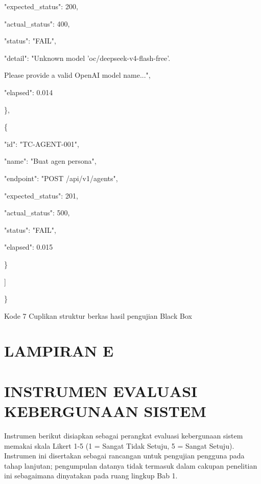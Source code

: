 \documentclass[12pt,a4paper]{article}
\begin{document}
"expected\_status": 200,



"actual\_status": 400,



"status": "FAIL",



"detail": "Unknown model 'oc/deepseek-v4-flash-free'.



Please provide a valid OpenAI model name...",



"elapsed": 0.014



\},



\{



"id": "TC-AGENT-001",



"name": "Buat agen persona",



"endpoint": "POST /api/v1/agents",



"expected\_status": 201,



"actual\_status": 500,



"status": "FAIL",



"elapsed": 0.015



\}



{]}



\}



Kode 7	Cuplikan struktur berkas hasil pengujian Black Box



\section*{LAMPIRAN E}

\section*{INSTRUMEN EVALUASI KEBERGUNAAN SISTEM}

Instrumen berikut disiapkan sebagai perangkat evaluasi kebergunaan sistem memakai skala Likert 1-5 (1 = Sangat Tidak Setuju, 5 = Sangat Setuju). Instrumen ini disertakan sebagai rancangan untuk pengujian pengguna pada tahap lanjutan; pengumpulan datanya tidak termasuk dalam cakupan penelitian ini sebagaimana dinyatakan pada ruang lingkup Bab 1.
\end{document}
